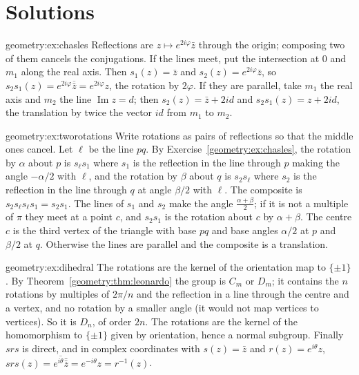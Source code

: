 \section{Solutions}

\begin{solution}{geometry:ex:chasles}
\idea Reflections are $z\mapsto e^{2i\varphi}\bar z$ through the origin; composing two of them cancels the conjugations.
\writeup If the lines meet, put the intersection at $0$ and $m_1$ along the real axis. Then $s_1(z)=\bar z$ and $s_2(z)=e^{2i\varphi}\bar z$, so
$s_2s_1(z)=e^{2i\varphi}\overline{\bar z}=e^{2i\varphi}z$, the rotation by $2\varphi$. If they are parallel, take $m_1$ the real axis and $m_2$
the line $\operatorname{Im}z=d$; then $s_2(z)=\bar z+2id$ and $s_2s_1(z)=z+2id$, the translation by twice the vector $id$ from $m_1$ to $m_2$.
\end{solution}

\begin{solution}{geometry:ex:tworotations}
\idea Write rotations as pairs of reflections so that the middle ones cancel.
\writeup Let $\ell$ be the line $pq$. By Exercise~\ref{geometry:ex:chasles}, the rotation by $\alpha$ about $p$ is $s_\ell s_1$ where $s_1$ is the reflection in the
line through $p$ making the angle $-\alpha/2$ with $\ell$, and the rotation by $\beta$ about $q$ is $s_2s_\ell$ where $s_2$ is the reflection in the
line through $q$ at angle $\beta/2$ with $\ell$. The composite is $s_2s_\ell s_\ell s_1=s_2s_1$. The lines of $s_1$ and $s_2$ make the angle
$\frac{\alpha+\beta}2$; if it is not a multiple of $\pi$ they meet at a point $c$, and $s_2s_1$ is the rotation about $c$ by $\alpha+\beta$. The
centre $c$ is the third vertex of the triangle with base $pq$ and base angles $\alpha/2$ at $p$ and $\beta/2$ at $q$. Otherwise the lines are
parallel and the composite is a translation.
\end{solution}

\begin{solution}{geometry:ex:dihedral}
\idea The rotations are the kernel of the orientation map to $\{\pm1\}$.
\writeup By Theorem~\ref{geometry:thm:leonardo} the group is $C_m$ or $D_m$; it contains the $n$ rotations by multiples of $2\pi/n$ and the reflection in a
line through the centre and a vertex, and no rotation by a smaller angle (it would not map vertices to vertices). So it is $D_n$, of
order $2n$. The rotations are the kernel of the homomorphism to $\{\pm1\}$ given by orientation, hence a normal subgroup. Finally $srs$ is
direct, and in complex coordinates with $s(z)=\bar z$ and $r(z)=e^{i\theta}z$, $srs(z)=\overline{e^{i\theta}\bar{\bar z}}=e^{-i\theta}z=r^{-1}(z)$.
\end{solution}

